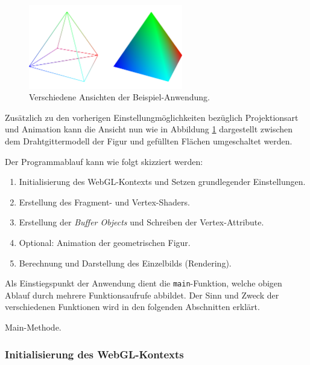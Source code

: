 \begin{figure}[!htb]
	\centering
	\includegraphics[width=0.6\textwidth]{kap4/webgl/figures/pyramid_views.png}
	\caption{Verschiedene Ansichten der Beispiel-Anwendung.}
	\label{FIG:WEBGL_EXAMPLE_VIEWS}
\end{figure}

Zusätzlich zu den vorherigen Einstellungmöglichkeiten bezüglich Projektionsart und Animation kann die Ansicht nun wie in Abbildung \ref{FIG:WEBGL_EXAMPLE_VIEWS} dargestellt zwischen dem Drahtgittermodell der Figur und gefüllten Flächen umgeschaltet werden.

Der Programmablauf kann wie folgt skizziert werden:

\begin{enumerate}[noitemsep]
	\item Initialisierung des WebGL-Kontexts und Setzen grundlegender Einstellungen.
	\item Erstellung des Fragment- und Vertex-Shaders.
	\item Erstellung der \emph{Buffer Objects} und Schreiben der Vertex-Attribute.
	\item Optional: Animation der geometrischen Figur.
	\item Berechnung und Darstellung des Einzelbilds (Rendering).
\end{enumerate}

Als Einstiegspunkt der Anwendung dient die \texttt{main}-Funktion, welche obigen Ablauf durch mehrere Funktionsaufrufe abbildet. Der Sinn und Zweck der verschiedenen Funktionen wird in den folgenden Abschnitten erklärt.

\smallskip
\begin{listing}[!htb]
\caption{Main-Methode.}
\label{LISTING:WEBGL_EXAMPLE_MAIN}
\end{listing}

\subsubsection{Initialisierung des WebGL-Kontexts}


